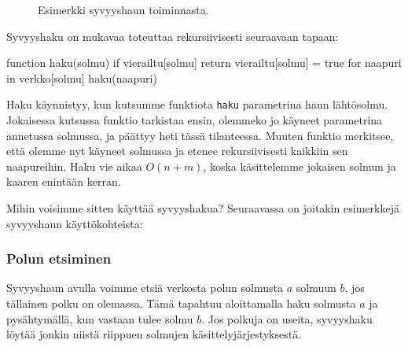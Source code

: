 \begin{figure}
\begin{center}
\end{center}
\caption{Esimerkki syvyyshaun toiminnasta.}
\label{fig:syvhak}
\end{figure}

Syvyyshaku on mukavaa toteuttaa rekursiivisesti seuraavaan tapaan:

\begin{code}
function haku(solmu)
    if vierailtu[solmu]
        return
    vierailtu[solmu] = true
    for naapuri in verkko[solmu]
        haku(naapuri)
\end{code}

Haku käynnistyy, kun kutsumme funktiota
\texttt{haku} parametrina haun lähtö\-solmu.
Jokaisessa kutsussa funktio tarkistaa ensin,
olemmeko jo käyneet parametrina annetussa solmussa,
ja päättyy heti tässä tilanteessa.
Muuten funktio merkitsee, että olemme nyt käyneet solmussa
ja etenee rekursiivisesti kaikkiin sen naapureihin.
Haku vie aikaa $O(n+m)$, koska käsittelemme jokaisen
solmun ja kaaren enintään kerran.

Mihin voisimme sitten käyttää syvyyshakua?
Seuraavassa on joitakin esimerkkejä syvyyshaun käyttökohteista:

\subsubsection{Polun etsiminen}

Syvyyshaun avulla voimme etsiä verkosta polun solmusta
$a$ solmuun $b$, jos tällainen polku on olemassa.
Tämä tapahtuu aloittamalla haku solmusta $a$
ja pysähtymällä, kun vastaan tulee solmu $b$.
Jos polkuja on useita, syvyyshaku löytää jonkin niistä
riippuen solmujen käsittelyjärjestyksestä.

